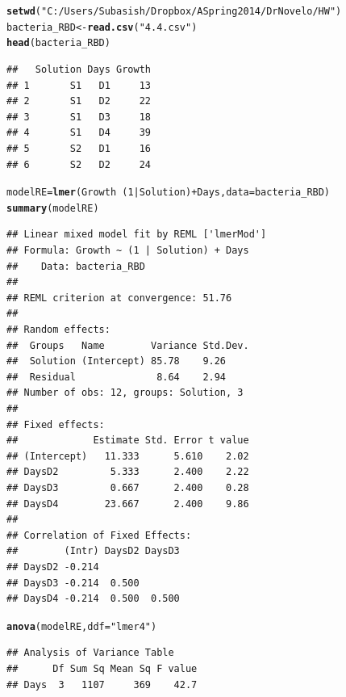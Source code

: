 \documentclass[a4paper]{article}\usepackage{graphicx, color}
\makeatletter
\newcommand{\hlfunctioncall}[1]{\textcolor[rgb]{0.501960784313725,0,0.329411764705882}{\textbf{#1}}}%
\newcommand{\hlstring}[1]{\textcolor[rgb]{0.6,0.6,1}{#1}}%
\newenvironment{kframe}{%
 \def\at@end@of@kframe{}%
 \ifinner\ifhmode%
  \def\at@end@of@kframe{\end{minipage}}%
  \begin{minipage}{\columnwidth}%
 \fi\fi%
 \def\FrameCommand##1{\hskip\@totalleftmargin \hskip-\fboxsep
 \colorbox{shadecolor}{##1}\hskip-\fboxsep
     \hskip-\linewidth \hskip-\@totalleftmargin \hskip\columnwidth}%
 \MakeFramed {\advance\hsize-\width
   \@totalleftmargin\z@ \linewidth\hsize
   \@setminipage}}%
 {\par\unskip\endMakeFramed%
 \at@end@of@kframe}
\newenvironment{knitrout}{}{} %
\makeatother
\begin{document}
\begin{knitrout}
\color{fgcolor}\begin{kframe}
\begin{alltt}
\hlfunctioncall{setwd}(\hlstring{"C:/Users/Subasish/Dropbox/A Spring 2014/Dr Novelo/HW"})
bacteria_RBD <- \hlfunctioncall{read.csv}(\hlstring{"4.4.csv"})
\hlfunctioncall{head}(bacteria_RBD)
\end{alltt}
\begin{verbatim}
##   Solution Days Growth
## 1       S1   D1     13
## 2       S1   D2     22
## 3       S1   D3     18
## 4       S1   D4     39
## 5       S2   D1     16
## 6       S2   D2     24
\end{verbatim}
\begin{alltt}

modelRE = \hlfunctioncall{lmer}(Growth ~ (1 | Solution) + Days, data = bacteria_RBD)
\hlfunctioncall{summary}(modelRE)
\end{alltt}
\begin{verbatim}
## Linear mixed model fit by REML ['lmerMod']
## Formula: Growth ~ (1 | Solution) + Days 
##    Data: bacteria_RBD 
## 
## REML criterion at convergence: 51.76 
## 
## Random effects:
##  Groups   Name        Variance Std.Dev.
##  Solution (Intercept) 85.78    9.26    
##  Residual              8.64    2.94    
## Number of obs: 12, groups: Solution, 3
## 
## Fixed effects:
##             Estimate Std. Error t value
## (Intercept)   11.333      5.610    2.02
## DaysD2         5.333      2.400    2.22
## DaysD3         0.667      2.400    0.28
## DaysD4        23.667      2.400    9.86
## 
## Correlation of Fixed Effects:
##        (Intr) DaysD2 DaysD3
## DaysD2 -0.214              
## DaysD3 -0.214  0.500       
## DaysD4 -0.214  0.500  0.500
\end{verbatim}
\begin{alltt}
\hlfunctioncall{anova}(modelRE, ddf = \hlstring{"lmer4"})
\end{alltt}
\begin{verbatim}
## Analysis of Variance Table
##      Df Sum Sq Mean Sq F value
## Days  3   1107     369    42.7
\end{verbatim}
\begin{alltt}



\end{alltt}
\end{kframe}
\end{knitrout}
\end{document}
